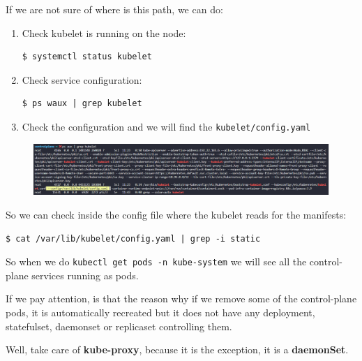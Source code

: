 \documentclass{article}
\newenvironment{blocktemplate}[1]{%
    \tcolorbox[beamer,%
    noparskip,breakable,
    colframe=Blue,%
    colbacklower=LimeGreen!75!LightGreen,%
    title=#1]}%
    {\endtcolorbox}
\newenvironment{blocktemplateI}[1]{%
    \tcolorbox[beamer,%
    noparskip,breakable,
    colframe=Violet,%
    colbacklower=Black,%
    title=#1]}%
    {\endtcolorbox}
\newenvironment{codetemplate}[1][]{%
  \mybasecolorbox[#1]
  \itshape
}{%
  \endmybasecolorbox
}
\begin{document}
\begin{blocktemplate}{NOTE}
If we are not sure of where is this path, we can do:
\begin{enumerate}
    \item Check kubelet is running on the node:
\begin{codetemplate}{}
\begin{verbatim}
$ systemctl status kubelet
\end{verbatim}
\end{codetemplate}

    \item Check service configuration:
\begin{codetemplate}{}
\begin{verbatim}
$ ps waux | grep kubelet
\end{verbatim}
\end{codetemplate}

    \item Check the configuration and we will find the \verb|kubelet/config.yaml|
\end{enumerate}
\begin{figure}[H]
    \includegraphics[width=\textwidth]{pictures/kubelet-config.png}
\end{figure}
\end{blocktemplate}

So we can check inside the config file where the kubelet reads for the manifests:
\begin{codetemplate}{}
\begin{verbatim}
$ cat /var/lib/kubelet/config.yaml | grep -i static
\end{verbatim}
\end{codetemplate}

So when we do \verb|kubectl get pods -n kube-system| we will see all the control-plane services running as pods.

\begin{blocktemplateI}{NOTE}
If we pay attention, is that the reason why if we remove some of the control-plane pods, it is automatically recreated but it does not have any deployment, statefulset, daemonset or replicaset controlling them.

Well, take care of \textbf{kube-proxy}, because it is the exception, it is a \textbf{daemonSet}.
\end{blocktemplateI}
\end{document}
